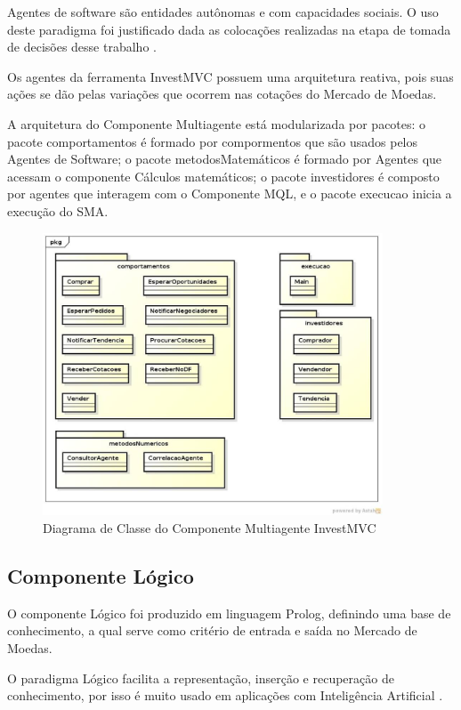 Agentes de software são entidades autônomas e com capacidades sociais. O uso deste paradigma foi justificado dada as colocações realizadas na etapa de tomada de decisões desse trabalho \cite{agentBuilderWhy}. 

Os agentes da ferramenta  InvestMVC possuem uma arquitetura reativa, pois suas ações se dão pelas variações que ocorrem nas cotações do Mercado de Moedas.

A arquitetura do Componente Multiagente está modularizada por pacotes: o pacote comportamentos é formado por compormentos que são usados pelos Agentes de Software; o pacote metodosMatemáticos é formado por Agentes que acessam o componente Cálculos matemáticos; o pacote investidores é composto por agentes que interagem com o Componente MQL, e o pacote execucao inicia a execução do SMA.

\begin{figure}[H]
\centering
\includegraphics[width=0.9\textwidth]{figuras/diagramaClassesSMA}
\caption{Diagrama de Classe do Componente Multiagente InvestMVC} 
\label{diagramaClassesSMA}
\end{figure}

\subsection{Componente Lógico}

O componente Lógico foi produzido em linguagem Prolog, definindo uma base de conhecimento, a qual serve como critério de entrada e saída no Mercado de Moedas.

O paradigma Lógico facilita a representação, inserção e recuperação de conhecimento, por isso é muito usado em aplicações com Inteligência Artificial \cite{almeida2010}.

